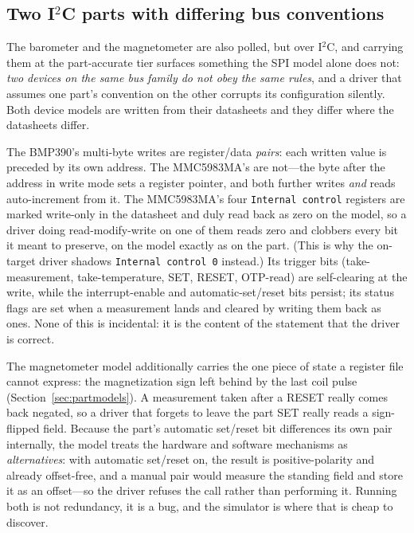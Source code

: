 \documentclass[preprint,12pt,a4paper]{elsarticle}
\newcommand{\code}[1]{\texttt{\small #1}}
\begin{document}
\subsection{Two I\texorpdfstring{$^2$}{2}C parts with differing bus conventions}
\label{sec:i2c}
The barometer and the magnetometer are also polled, but over I$^2$C, and
carrying them at the part-accurate tier surfaces something the SPI model alone
does not: \emph{two devices on the same bus family do not obey the same rules},
and a driver that assumes one part's convention on the other corrupts its
configuration silently. Both device models are written from their datasheets and
they differ where the datasheets differ.

The BMP390's multi-byte writes are register/data \emph{pairs}: each written
value is preceded by its own address. The MMC5983MA's are not---the byte after
the address in write mode sets a register pointer, and both further writes
\emph{and} reads auto-increment from it. The MMC5983MA's four
\code{Internal control} registers are marked write-only in the datasheet and
duly read back as zero on the model, so a driver doing read-modify-write on one
of them reads zero and clobbers every bit it meant to preserve, on the model
exactly as on the part. (This is why the on-target driver shadows
\code{Internal control 0} instead.) Its trigger bits (take-measurement,
take-temperature, SET, RESET, OTP-read) are self-clearing at the write, while
the interrupt-enable and automatic-set/reset bits persist; its status flags are
set when a measurement lands and cleared by writing them back as ones. None of
this is incidental: it is the content of the statement that the driver is correct.

The magnetometer model additionally carries the one piece of state a register
file cannot express: the magnetization sign left behind by the last coil pulse
(Section~\ref{sec:partmodels}). A measurement taken after a RESET really comes
back negated, so a driver that forgets to leave the part SET really reads a
sign-flipped field. Because the part's automatic set/reset bit differences its
own pair internally, the model treats the hardware and software mechanisms as
\emph{alternatives}: with automatic set/reset on, the result is
positive-polarity and already offset-free, and a manual pair would measure the
standing field and store it as an offset---so the driver refuses the call rather
than performing it. Running both is not redundancy, it is a bug, and the
simulator is where that is cheap to discover.
\end{document}
